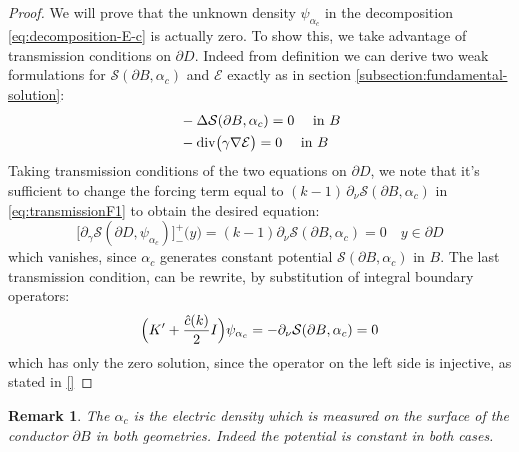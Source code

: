 \documentclass[10pt, a4paper, twoside, openright]{book}
\theoremstyle{definition}
\theoremstyle{plain}
\theoremstyle{plain}
\theoremstyle{plain}
\theoremstyle{plain}
\newtheorem{remark}[subsection]{Remark}
\theoremstyle{plain}
\theoremstyle{plain}
\theoremstyle{plain}
\theoremstyle{plain}
\DeclareMathOperator{\divergence}{div}
\begin{document}
\begin{proof}
We will prove that the unknown density $\psi_{\alpha_c}$ in the decomposition \ref{eq:decomposition-E-c} is actually zero. To show this, we take advantage of transmission conditions on $\partial D$. 
Indeed from definition we can derive two weak formulations for $\mathcal{S}(\partial B, \alpha_c)$ and $\mathcal{E}$ exactly as in section \ref{subsection:fundamental-solution}:
\begin{align}
 &-\Delta\mathcal{S}(\partial B,\alpha_c) = 0\quad\textup{ in }B\\
 &-\divergence\bigl(\gamma\nabla\mathcal{E}\bigr) = 0\quad\textup{ in }B
\end{align}
Taking transmission conditions of the two equations on $\partial D$, we note that it's sufficient to change the forcing term equal to $(k-1)\,\partial_\nu\mathcal{S}(\partial B, \alpha_{c})$ in \ref{eq:transmissionF1} to obtain the desired equation:
\begin{equation}
 \bigl[\partial_\gamma \mathcal{S}(\partial D,\psi_{\alpha_{c}})\bigr]^+_-\bigl(y\bigr) = (k - 1)\partial_\nu \mathcal{S}(\partial B,\alpha_{c})=0 \quad y \in\partial D
\end{equation}
which vanishes, since $\alpha_{c}$ generates constant potential $\mathcal{S}(\partial B,\alpha_{c})$ in $B$. The last transmission condition, can be rewrite, by substitution of integral boundary operators:
\begin{equation}
 \Bigl(K' + \frac{\hat{c}(k)}{2} I\Bigr)\psi_{\alpha_c} = -\partial_\nu \mathcal{S}(\partial B, \alpha_c) = 0
\end{equation}
which has only the zero solution, since the operator on the left side is injective, as stated in \ref{}
\end{proof}
\begin{remark}
 The $\alpha_c$ is the electric density which is measured on the surface of the conductor $\partial B$ in both geometries. Indeed the potential is constant in both cases.
\end{remark}
\end{document}
